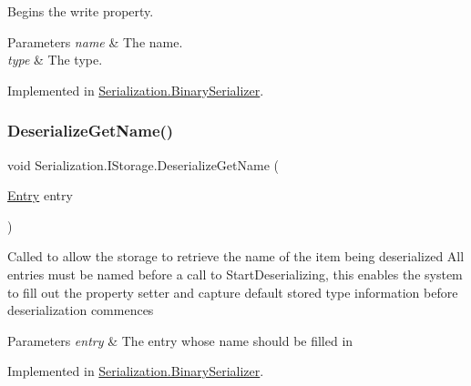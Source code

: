 Begins the write property. 


\begin{DoxyParams}{Parameters}
{\em name} & The name.\\
\hline
{\em type} & The type.\\
\hline
\end{DoxyParams}


Implemented in \hyperlink{class_serialization_1_1_binary_serializer_adbfae0ca57e2c848c4efa0ae23b25e62}{Serialization.\+Binary\+Serializer}.

\mbox{\label{interface_serialization_1_1_i_storage_ad17a92256ad7a7196084e05bad968567}} 
\subsubsection{\texorpdfstring{Deserialize\+Get\+Name()}{DeserializeGetName()}}
{\footnotesize\ttfamily void Serialization.\+I\+Storage.\+Deserialize\+Get\+Name (\begin{DoxyParamCaption}\item[{\hyperlink{class_serialization_1_1_entry}{Entry}}]{entry }\end{DoxyParamCaption})}



Called to allow the storage to retrieve the name of the item being deserialized All entries must be named before a call to Start\+Deserializing, this enables the system to fill out the property setter and capture default stored type information before deserialization commences 


\begin{DoxyParams}{Parameters}
{\em entry} & The entry whose name should be filled in\\
\hline
\end{DoxyParams}


Implemented in \hyperlink{class_serialization_1_1_binary_serializer_ac02802eda1961199b7e91adce7c33de7}{Serialization.\+Binary\+Serializer}.

\mbox{\label{interface_serialization_1_1_i_storage_aace2c7b698493c52356bff6422d37f74}} 
